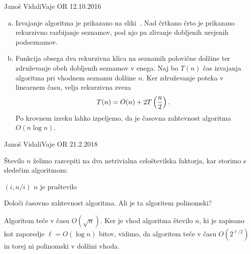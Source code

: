 \begin{naloga}{Janoš Vidali}{Vaje OR 12.10.2016}
\begin{odgovor}
\begin{enumerate}[(a)]
\item Izvajanje algoritma je prikazano na sliki~\fig{}.
Nad črtkano črto je prikazano rekurzivno razbijanje seznamov,
pod njo pa zlivanje dobljenih urejenih podseznamov.

\item Funkcija obsega dva rekurzivna klica na seznamih polovične dolžine
ter združevanje obeh dobljenih seznamov v enega.
Naj bo $T(n)$ čas izvajanja algoritma pri vhodnem seznamu dolžine $n$.
Ker združevanje poteka v linearnem času, velja rekurzivna zveza
$$
T(n) = O(n) + 2T\left({n \over 2}\right) .
$$
Po krovnem izreku lahko izpeljemo,
da je časovna zahtevnost algoritma $O(n \log n)$.
\end{enumerate}

\begin{slika}
\pgfslika
{}
\end{slika}
\end{odgovor}
\end{naloga}


\begin{naloga}{Janoš Vidali}{Vaje OR 21.2.2018}
\begin{vprasanje}[razcep]
Število $n$ želimo razcepiti
na dva netrivialna celoštevilska faktorja,
kar storimo s sledečim algoritmom:
\begin{small}
\begin{algorithmic}
            \State \Return $(i, n/i)$
        \EndIf
    \EndFor
    \State \Return $n$ je praštevilo
\EndFunction
\end{algorithmic}
\end{small}
Določi časovno zahtevnost algoritma.
Ali je ta algoritem polinomski?
\end{vprasanje}

\begin{odgovor}
Algoritem teče v času $O(\sqrt{n})$.
Ker je vhod algoritma število $n$,
ki je zapisano kot zaporedje $\ell = O(\log n)$ bitov,
vidimo, da algoritem teče v času $O(2^{\ell/2})$
in torej ni polinomski v dolžini vhoda.
\end{odgovor}
\end{naloga}


